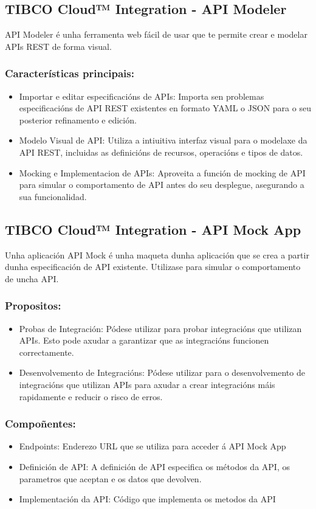 \begin{flushleft}
    \subsection{TIBCO Cloud™ Integration - API Modeler}
    API Modeler é unha ferramenta web fácil de usar que te permite crear e modelar APIs REST de forma visual.
    \subsubsection{Características principais: }
    \begin{itemize}
        \item Importar e editar especificacións de APIs: Importa sen problemas especificacións de API REST existentes en formato YAML o JSON para o seu posterior refinamento e edición.
        \item Modelo Visual de API: Utiliza a intiuitiva interfaz visual para o modelaxe da API REST, incluidas as definicións de recursos, operacións e tipos de datos.
        \item Mocking e Implementacion de APIs: Aproveita a función de mocking de API para simular o comportamento de API antes do seu desplegue, asegurando a sua funcionalidad.
    \end{itemize}
    \subsection{TIBCO Cloud™ Integration - API Mock App}
    Unha aplicación API Mock é unha maqueta dunha aplicación que se crea a partir dunha especificación de API existente. 
    Utilizase para simular o comportamento de uncha API. 
    \subsubsection{Propositos: }
    \begin{itemize}
        \item Probas de Integración: Pódese utilizar para probar integracións que utilizan APIs. Esto pode axudar a garantizar que as integracións funcionen correctamente.
        \item Desenvolvemento de Integracións: Pódese utilizar para o desenvolvemento de integracións que utilizan APIs para axudar a crear integracións máis rapidamente e reducir o risco de erros.
    \end{itemize}
    \subsubsection{Compoñentes: }
    \begin{itemize}
        \item Endpoints: Enderezo URL que se utiliza para acceder á API Mock App
        \item Definición de API: A definición de API especifica os métodos da API, os parametros que aceptan e os datos que devolven.
        \item Implementación da API: Código que implementa os metodos da API
    \end{itemize}

\end{flushleft}

